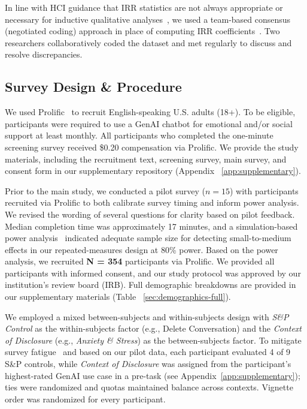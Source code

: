 \documentclass[letterpaper,twocolumn,10pt]{article}
\begin{document}
 In line with HCI guidance that IRR statistics are not always appropriate or necessary for inductive qualitative analyses~\cite{mcdonald2019reliability}, we used a team-based consensus (negotiated coding) approach in place of computing IRR coefficients~\cite{ortloff2023different}. Two researchers collaboratively coded the dataset and met regularly to discuss and resolve discrepancies. 

\subsection{Survey Design \& Procedure}
\label{sec:survey}

 We used Prolific~\cite{palan2018prolific} to recruit English-speaking U.S. adults (18+). To be eligible, participants were required to use a GenAI chatbot for emotional and/or social support at least monthly. All participants who completed the one-minute screening survey received \$0.20 compensation via Prolific. We provide the study materials, including the recruitment text, screening survey, main survey, and consent form in our supplementary repository (Appendix ~\ref{app:supplementary}).

Prior to the main study, we conducted a pilot survey ($n=15$) with participants recruited via Prolific to both calibrate survey timing and inform power analysis. We revised the wording of several questions for clarity based on pilot feedback. Median completion time was approximately 17 minutes, and a simulation-based power analysis~\cite{green2016simr} indicated adequate sample size for detecting small-to-medium effects in our repeated-measures design at 80\% power. Based on the power analysis, we recruited \textbf{N = 354} participants via Prolific. We provided all participants with informed consent, and our study protocol was approved by our institution's review board (IRB). Full demographic breakdowns are provided in our supplementary materials (Table ~\ref{sec:demographics-full}).

 We employed a mixed between-subjects and within-subjects design with \textit{S\&P Control} as the within-subjects factor (e.g., Delete Conversation) and the \textit{Context of Disclosure} (e.g., \emph{Anxiety \& Stress}) as the between-subjects factor. To mitigate survey fatigue~\cite{backor2007estimating} and based on our pilot data, each participant evaluated 4 of 9 S\&P controls, while \textit{Context of Disclosure} was assigned from the participant's highest-rated GenAI use case in a pre-task (see Appendix~\ref{app:supplementary}); ties were randomized and quotas maintained balance across contexts. Vignette order was randomized for every participant.
\end{document}
